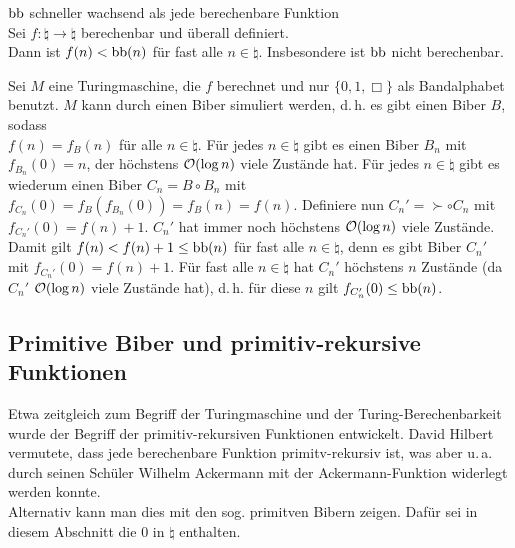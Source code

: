 \begin{Satz}{$\text{bb}$ schneller wachsend als jede berechenbare Funktion}\\
    Sei $f\colon \natural \rightarrow \natural$ berechenbar und überall definiert.\\
    Dann ist $f(n) < \text{bb}(n)$ für fast alle $n \in \natural$.
    Insbesondere ist $\text{bb}$ nicht berechenbar.
\end{Satz}

\begin{Beweis}
    Sei $M$ eine Turingmaschine, die $f$ berechnet und nur $\{0, 1, \Box\}$ als
    Bandalphabet benutzt.
    $M$ kann durch einen Biber simuliert werden, d.\,h. es gibt einen Biber $B$, sodass\\
    $f(n) = f_B(n)$ für alle $n \in \natural$.
    Für jedes $n \in \natural$ gibt es einen Biber $B_n$ mit $f_{B_n}(0) = n$,
    der höchstens $\mathcal{O}(\log n)$ viele Zustände hat.
    Für jedes $n \in \natural$ gibt es wiederum einen Biber
    $C_n = B \circ B_n$ mit $f_{C_n}(0) = f_B(f_{B_n}(0)) = f_B(n) = f(n)$.
    Definiere nun $C_n' = \succ \circ C_n$ mit $f_{C_n'}(0) = f(n) + 1$.
    $C_n'$ hat immer noch höchstens $\mathcal{O}(\log n)$ viele Zustände.\\
    Damit gilt $f(n) < f(n) + 1 \le \text{bb}(n)$ für fast alle $n \in \natural$,
    denn es gibt Biber $C_n'$ mit $f_{C_n'}(0) = f(n) + 1$.
    Für fast alle $n \in \natural$ hat $C_n'$ höchstens $n$ Zustände
    (da $C_n'$ $\mathcal{O}(\log n)$ viele Zustände hat), d.\,h.
    für diese $n$ gilt $f_{C_n'}(0) \le \text{bb}(n)$.
\end{Beweis}

\pagebreak

\subsection{%
    Primitive Biber und primitiv-rekursive Funktionen%
}

\begin{Bem}
    Etwa zeitgleich zum Begriff der Turingmaschine und der Turing-Berechenbarkeit wurde der
    Begriff der primitiv-rekursiven Funktionen entwickelt.
    David Hilbert vermutete, dass jede berechenbare Funktion primitv-rekursiv ist,
    was aber u.\,a. durch seinen Schüler Wilhelm Ackermann mit der Ackermann-Funktion widerlegt
    werden konnte.\\
    Alternativ kann man dies mit den sog. primitven Bibern zeigen.
    Dafür sei in diesem Abschnitt die $0$ in $\natural$ enthalten.
\end{Bem}

